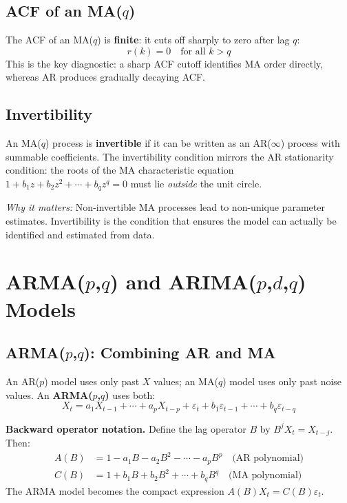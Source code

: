 \documentclass[11pt]{article}
\begin{document}
\subsection{ACF of an MA($q$)}
The ACF of an MA($q$) is \textbf{finite}: it cuts off sharply to zero after
lag $q$:
\[
r(k) = 0 \quad \text{for all } k > q
\]
This is the key diagnostic: a sharp ACF cutoff identifies MA order directly,
whereas AR produces gradually decaying ACF.

\subsection{Invertibility}
An MA($q$) process is \textbf{invertible} if it can be written as an AR($\infty$)
process with summable coefficients. The invertibility condition mirrors the AR
stationarity condition: the roots of the MA characteristic equation
$1 + b_1 z + b_2 z^2 + \cdots + b_q z^q = 0$ must lie \emph{outside} the unit
circle.

\textit{Why it matters:} Non-invertible MA processes lead to non-unique
parameter estimates. Invertibility is the condition that ensures the model can
actually be identified and estimated from data.


\section{ARMA($p$,$q$) and ARIMA($p$,$d$,$q$) Models}

\subsection{ARMA($p$,$q$): Combining AR and MA}
An AR($p$) model uses only past $X$ values; an MA($q$) model uses only past
noise values. An \textbf{ARMA($p$,$q$)} uses both:
\[
X_t = a_1 X_{t-1} + \cdots + a_p X_{t-p}
    + \varepsilon_t + b_1 \varepsilon_{t-1} + \cdots + b_q \varepsilon_{t-q}
\]

\textbf{Backward operator notation.} Define the lag operator $B$ by
$B^j X_t = X_{t-j}$. Then:
\begin{align*}
A(B) &= 1 - a_1 B - a_2 B^2 - \cdots - a_p B^p  \quad\text{(AR polynomial)} \\
C(B) &= 1 + b_1 B + b_2 B^2 + \cdots + b_q B^q  \quad\text{(MA polynomial)}
\end{align*}
The ARMA model becomes the compact expression $A(B)X_t = C(B)\varepsilon_t$.
\end{document}

